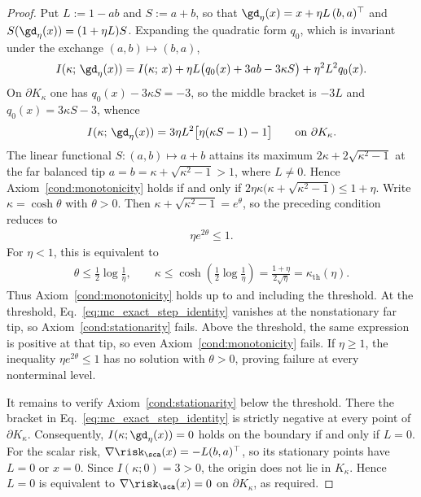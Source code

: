 \documentclass{article}
\begin{document}
\begin{proof}
Put $L:=1-ab$ and $S:=a+b$, so that
$\gd_\eta(x)=x+\eta L\,(b,a)^\top$ and $S(\gd_\eta(x))=(1+\eta L)S$. Expanding
the quadratic form $q_0$, which is invariant under the exchange
$(a,b)\mapsto(b,a)$,
\begin{align}
    I(\kappa;\,\gd_\eta(x))
    = I(\kappa;\,x)
      + \eta L\bigl(q_0(x)+3ab-3\kappa S\bigr)
      + \eta^2L^2 q_0(x) .
\end{align}
On $\partial K_\kappa$ one has $q_0(x)-3\kappa S=-3$, so the middle bracket is
$-3L$ and $q_0(x)=3\kappa S-3$, whence
\begin{align}
    I(\kappa;\,\gd_\eta(x)) = 3\eta L^2\bigl[\eta(\kappa S-1)-1\bigr]
    \qquad\text{on }\partial K_\kappa .
    \label{eq:mc_exact_step_identity}
\end{align}
The linear functional $S:(a,b)\mapsto a+b$ attains its maximum
$2\kappa+2\sqrt{\kappa^2-1}$ at the far balanced tip
$a=b=\kappa+\sqrt{\kappa^2-1}>1$, where $L\ne0$. Hence
Axiom~\ref{cond:monotonicity} holds if and only if
$2\eta\kappa\bigl(\kappa+\sqrt{\kappa^2-1}\bigr)\le1+\eta$.
Write $\kappa=\cosh\theta$ with $\theta>0$. Then
$\kappa+\sqrt{\kappa^2-1}=e^\theta$, so the preceding condition reduces to
\begin{align}
    \eta e^{2\theta}\le1.
\end{align}
For $\eta<1$, this is equivalent to
\begin{align}
    \theta\le\frac12\log\frac1\eta,
    \qquad
    \kappa\le
    \cosh\!\left(\frac12\log\frac1\eta\right)
    =\frac{1+\eta}{2\sqrt\eta}
    =\kappa_{\mathrm{th}}(\eta).
\end{align}
Thus Axiom~\ref{cond:monotonicity} holds up to and including the threshold.
At the threshold, Eq.~\eqref{eq:mc_exact_step_identity} vanishes at the
nonstationary far tip, so Axiom~\ref{cond:stationarity} fails. Above the
threshold, the same expression is positive at that tip, so even
Axiom~\ref{cond:monotonicity} fails. If $\eta\ge1$, the inequality
$\eta e^{2\theta}\le1$ has no solution with $\theta>0$, proving failure at
every nonterminal level.

It remains to verify Axiom~\ref{cond:stationarity} below the threshold. There
the bracket in Eq.~\eqref{eq:mc_exact_step_identity} is strictly negative at
every point of $\partial K_\kappa$. Consequently,
$I(\kappa;\gd_\eta(x))=0$ holds on the boundary if and only if $L=0$. For the
scalar risk, $\nabla\risk_\sca(x)=-L(b,a)^\top$, so its stationary points have
$L=0$ or $x=0$. Since $I(\kappa;0)=3>0$, the origin does not lie in
$K_\kappa$. Hence $L=0$ is equivalent to $\nabla\risk_\sca(x)=0$ on
$\partial K_\kappa$, as required.
\end{proof}
\end{document}
